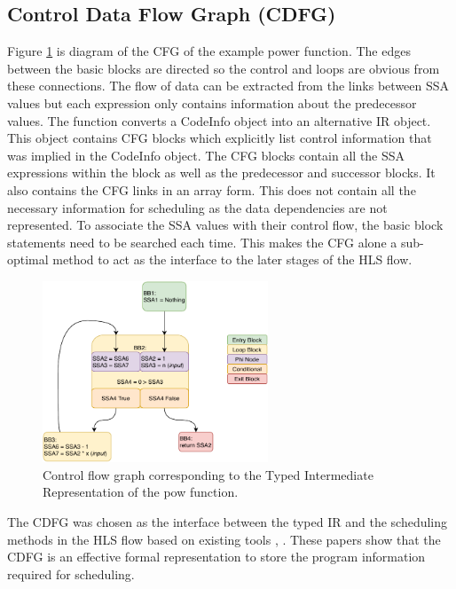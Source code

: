 \subsection{Control Data Flow Graph (CDFG)}
Figure \ref{fig:cfg_pow} is diagram of the CFG of the example power function. The edges between the basic blocks are directed so the control and loops are obvious from these connections. The flow of data can be extracted from the links between SSA values but each expression only contains information about the predecessor values. The  function converts a CodeInfo object into an alternative IR object. This object contains CFG blocks which explicitly list control information that was implied in the CodeInfo object. The CFG blocks contain all the SSA expressions within the block as well as the predecessor and successor blocks. It also contains the CFG links in an array form. This does not contain all the necessary information for scheduling as the data dependencies are not represented. To associate the SSA values with their control flow, the basic block statements need to be searched each time. This makes the CFG alone a sub-optimal method to act as the interface to the later stages of the HLS flow.

\begin{figure}[htb!]
    \centering
    \includegraphics[width=0.6\textwidth]{Images/CFG.pdf}
    \caption{Control flow graph corresponding to the Typed Intermediate Representation of the pow function.}
    \label{fig:cfg_pow}
\end{figure}

The CDFG was chosen as the interface between the typed IR and the scheduling methods in the HLS flow based on existing tools \cite{legup_intro}, \cite{nymble_intro}. These papers show that the CDFG is an effective formal representation to store the program information required for scheduling. %


